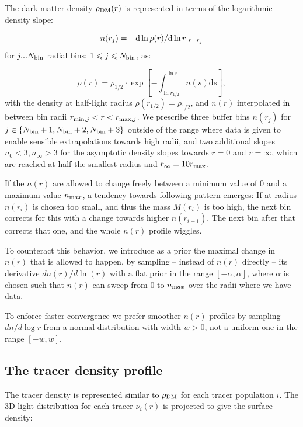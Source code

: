 The dark matter density $\rho_{\rm DM}(r)$ is represented in terms of the
logarithmic density slope:

\begin{equation}
  n(r_j)=-{\rm d}\ln\rho(r)/{\rm d}\ln r|_{r=r_j}
\end{equation}
for $j ... N_{\rm bin}$ radial bins: $1\leq j\leq N_{\rm bin}$, as:

\begin{equation*}
    \rho(r) = \rho_{1/2}\cdot\exp\left[-\int_{\ln r_{1/2}}^{\ln r}n(s)\text{d}s\right],
\end{equation*}
with the density at half-light radius $\rho(r_{1/2})=\rho_{1/2}$, and $n(r)$
interpolated in between bin radii $r_{{\rm min},j}<r<r_{{\rm
    max},j}$. We prescribe three buffer bins $n(r_j)$ for $j\in\{N_{\rm bin}+1,
N_{\rm bin}+2, N_{\rm bin}+3\}$ outside of the range where data is given to
enable sensible extrapolations towards high radii, and two additional slopes
$n_0 < 3, n_\infty>3$ for the asymptotic density slopes towards $r=0$ and
$r=\infty$, which are reached at half the smallest radius and $r_\infty=10r_{\rm
  max}$.

If the $n(r)$ are allowed to change freely between a minimum
value of $0$ and a maximum value $n_{\text max}$, a tendency towards following
pattern emerges: If at radius $n(r_i)$ is chosen too small, and thus the mass
$M(r_i)$ is too high, the next bin corrects for this with a change towards
higher $n(r_{i+1})$. The next bin after that corrects that one, and the whole
$n(r)$ profile wiggles.

To counteract this behavior, we introduce as a prior the maximal change in
$n(r)$ that is allowed to happen, by sampling -- instead of $n(r)$ directly --
its derivative $dn(r)/d\ln(r)$ with a flat prior in the range $[-\alpha,
\alpha]$, where $\alpha$ is chosen such that $n(r)$ can sweep from $0$ to
$n_{\text max}$ over the radii where we have data.

To enforce faster convergence we prefer smoother $n(r)$ profiles
by sampling $dn/d\log r$ from a normal distribution with width $w>0$,
not a uniform one in the range $[-w, w]$.

\subsection{The tracer density profile}
The tracer density is represented similar to $\rho_{\rm DM}$ for each tracer
population $i$. The 3D light distribution for each tracer $\nu_i(r)$ is
projected to give the surface density:

